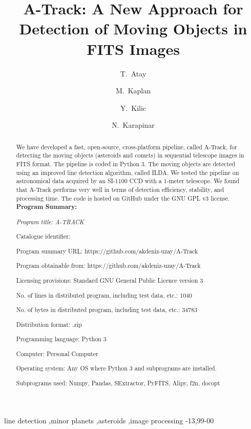 \documentclass[review]{elsarticle}
\begin{document}
\begin{frontmatter}

\title{A-Track: A New Approach for Detection of Moving Objects in FITS Images}


\author{T.~Atay}
\author{M.~Kaplan}
\author{Y.~Kilic}
\author{N.~Karapinar}

\address{Akdeniz University, Department of Space Sciences and Technologies, Antalya, Turkey}

\begin{abstract}
We have developed a fast, open-source, cross-platform pipeline, called A-Track, for detecting the moving objects (asteroids and comets) in sequential telescope images in FITS format. The pipeline is coded in Python 3. The moving objects are detected using an improved line detection algorithm, called ILDA. We tested the pipeline on astronomical data acquired by an SI-1100 CCD with a 
1-meter telescope. We found that A-Track performs very well in terms of detection efficiency, stability, and processing time. The code is hosted on GitHub under the GNU GPL v3 license.\\

\noindent
{\bf Program Summary:}

\noindent
{\em Program title: A-TRACK

\noindent
Catalogue identifier: 

\noindent
Program summary URL: https://github.com/akdeniz-uzay/A-Track

\noindent
Program obtainable from: https://github.com/akdeniz-uzay/A-Track

\noindent
Licensing provisions: Standard GNU General Public Licence version 3

\noindent
No. of lines in distributed program, including test data, etc.: 1040

\noindent
No. of bytes in distributed program, including test data, etc.: 34783

\noindent
Distribution format: .zip

\noindent
Programming language: Python 3

\noindent
Computer: Personal Computer

\noindent
Operating system: Any OS where Python 3 and subprograms are installed.

\noindent
Subprograms used: Numpy, Pandas, SExtractor, PyFITS, Alipy, f2n, docopt

}
\end{abstract}

\begin{keyword}
  line detection \sep minor planets \sep asteroids \sep image processing
  -13\sep  99-00
\end{keyword}

\end{frontmatter}
\end{document}
